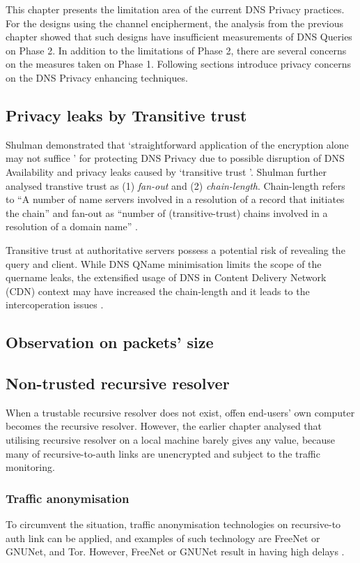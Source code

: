 This chapter presents the limitation area of the current DNS Privacy practices.
For the designs using the channel encipherment, the analysis from the previous chapter showed that such designs have insufficient measurements of DNS Queries on Phase 2.
In addition to the limitations of Phase 2, there are several concerns on the measures taken on Phase 1. Following sections introduce privacy concerns on the DNS Privacy enhancing techniques.

\subsection{Privacy leaks by Transitive trust}
Shulman demonstrated that `straightforward application of the encryption alone may not suffice \cite{Shulman:2014}' for protecting DNS Privacy due to possible disruption of DNS Availability and privacy leaks caused by `transitive trust \cite{Ramasubramanian:2005}'.
Shulman further analysed transtive trust as (1) \textit{fan-out} and (2) \textit{chain-length}.
Chain-length refers to ``A number of name servers involved in a resolution of a record that initiates the chain'' and fan-out as ``number of (transitive-trust) chains involved in a resolution of a domain name'' \cite{Shulman:2014}.

Transitive trust at authoritative servers possess a potential risk of revealing the query and client. While DNS QName minimisation \cite{bortzmeyer2016dns} limits the scope of the quername leaks, the extensified usage of DNS in Content Delivery Network (CDN) context \cite{WANG2018235} may have increased the chain-length and it leads to the intercoperation issues \cite{Huque-QNAME-Min-analysis}.
\subsection{Observation on packets' size}

\subsection{Non-trusted recursive resolver}
When a trustable recursive resolver does not exist, offen end-users' own computer becomes the recursive resolver. However, the earlier chapter analysed that utilising recursive resolver on a local machine barely gives any value, because many of recursive-to-auth links are unencrypted and subject to the traffic monitoring.

\subsubsection{Traffic anonymisation}
To circumvent the situation, traffic anonymisation technologies on recursive-to auth link can be applied, and examples of such technology are  FreeNet \cite{clarke2001freenet} or GNUNet\cite{grothoff2017gnunet}, and Tor.
However, FreeNet \cite{clarke2001freenet} or GNUNet \cite{grothoff2017gnunet} result in having high delays \cite{anonymousoverdns}.


